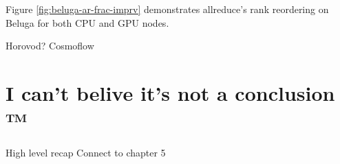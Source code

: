 Figure \ref{fig:beluga-ar-frac-imprv} demonstrates allreduce's rank reordering on Beluga for both CPU and GPU nodes.




% 

% 


Horovod? Cosmoflow

\section{I can't belive it's not a conclusion ™}
High level recap
Connect to chapter 5 

